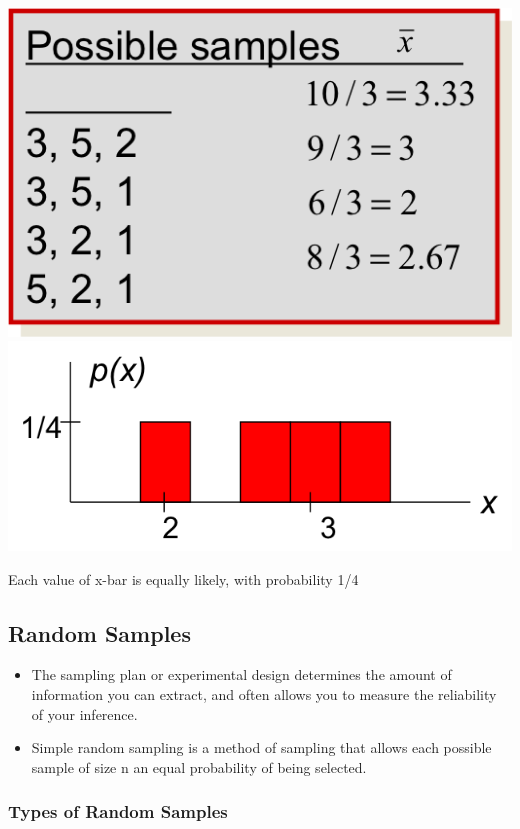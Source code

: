 \documentclass[]{article}
\begin{document}
\includegraphics{sampling_pop.png} \includegraphics{sampling_pop1.png}

Each value of x-bar is equally likely, with probability 1/4

\subsection{Random Samples}\label{random-samples}

\begin{itemize}
\itemsep1pt\parskip0pt
\item
  The sampling plan or experimental design determines the amount of
  information you can extract, and often allows you to measure the
  reliability of your inference.
\item
  Simple random sampling is a method of sampling that allows each
  possible sample of size n an equal probability of being selected.
\end{itemize}

\subsubsection{Types of Random Samples}\label{types-of-random-samples}
\end{document}

